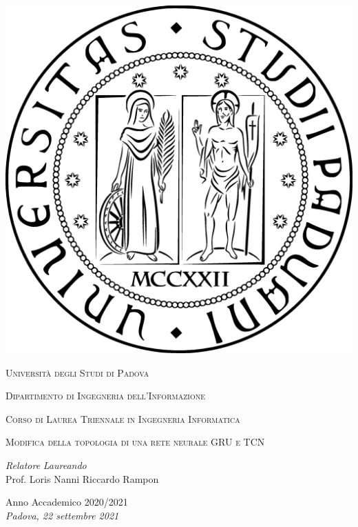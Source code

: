 \documentclass[a4paper, 12pt]{book}
\numberwithin{equation}{section}
\numberwithin{figure}{section}
\numberwithin{table}{section}
\begin{document}
	\renewcommand{\contentsname}{\vspace{-2cm} Indice \vspace{-0.5cm}}
	
	\begin{titlepage}
	
		\begin{center}
		
			\includegraphics[scale=0.11]{images/sigillo.eps}
			\vspace*{1cm}
			
			\textsc{\LARGE Università degli Studi di Padova}\\
			\vspace{0.25cm}
			
			\textsc{\normalsize Dipartimento di Ingegneria dell'Informazione}\\
			\vspace{0.25cm}
			
			\textsc{\normalsize Corso di Laurea Triennale in Ingegneria Informatica}
			\vfill
			
			\textsc{\LARGE Modifica della topologia di una rete neurale GRU e TCN}\\
			\vfill
			\vspace{4cm}
						
			\textsl{\large Relatore} \hfill \textsl{\large Laureando}\\
			\large Prof. Loris Nanni \hfill Riccardo Rampon
			\vfill
			
			{\large Anno Accademico 2020/2021}\\
			\textsl{\large Padova, 22 settembre 2021}				
		
		\end{center}
		
	\end{titlepage}
	
\end{document}
